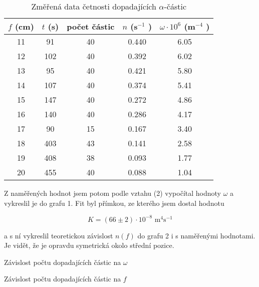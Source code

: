 \documentclass[a4paper,11pt]{article}
\begin{document}
\begin{table}[htpb]
    \centering
    \begin{tabular}{| c c c c c |}
        \hline
        $ f $  (cm) & $ t $ (s) &  počet částic & $ n $ (s$^{-1}  $ ) &  $ \omega \cdot 10^{6} $ (m$ ^{-4}  $ )  \\
        \hline
        11 &  91  & 40 & 0.440 & 6.05 \\
        12 &  102 & 40 & 0.392 & 6.02 \\
        13 &  95  & 40 & 0.421 & 5.80 \\
        14 &  107 & 40 & 0.374 & 5.41 \\
        15 &  147 & 40 & 0.272 & 4.86 \\
        16 &  140 & 40 & 0.286 & 4.17 \\
        17 &  90  & 15 & 0.167 & 3.40 \\
        18 &  403 & 43 & 0.141 & 2.58 \\
        19 &  408 & 38 & 0.093 & 1.77 \\
        20 &  455 & 40 & 0.088 & 1.04 \\
        \hline
    \end{tabular}
    \caption{Změřená data četnosti dopadajících $ \alpha $-částic }
    
\end{table}

Z naměřených hodnot jsem potom podle vztahu (2) vypočítal hodnoty $ \omega $ a vykreslil je do grafu 1. Fit byl přímkou, ze kterého jsem dostal hodnotu

\begin{equation}
K = (66 \pm 2) \cdot 10^{-8} \text{ m}^{4}\text{s}^{-1}
\end{equation}

\noindent
a s ní vykreslil teoretickou závislost $ n(f) $ do grafu 2 i s naměřenými hodnotami. Je vidět, že je opravdu symetrická okolo střední pozice.

\begin{table}[htpb]
    \begin{minipage}[b]{.48\linewidth}
        \centering
        \resizebox{\textwidth}{!}{  }
        \captionsetup{type=graph}
        \caption{ Závislost počtu dopadajících částic na $ \omega $  }
    \end{minipage} 
    \hfill
    \begin{minipage}[b]{.48\linewidth}
        \centering
        \resizebox{\textwidth}{!}{  }
        \captionsetup{type=graph}
        \caption{ Závislost počtu dopadajících částic na $ f $  }
    \end{minipage} 
\end{table}
\end{document}
